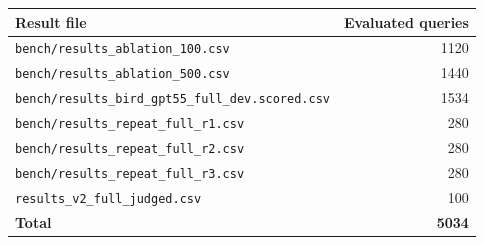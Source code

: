 \begin{tabular}{lr}
\toprule
Result file & Evaluated queries \\
\midrule
\texttt{bench/results\_ablation\_100.csv} & 1120 \\
\texttt{bench/results\_ablation\_500.csv} & 1440 \\
\texttt{bench/results\_bird\_gpt55\_full\_dev.scored.csv} & 1534 \\
\texttt{bench/results\_repeat\_full\_r1.csv} & 280 \\
\texttt{bench/results\_repeat\_full\_r2.csv} & 280 \\
\texttt{bench/results\_repeat\_full\_r3.csv} & 280 \\
\texttt{results\_v2\_full\_judged.csv} & 100 \\
\midrule
\textbf{Total} & \textbf{5034} \\
\bottomrule
\end{tabular}
